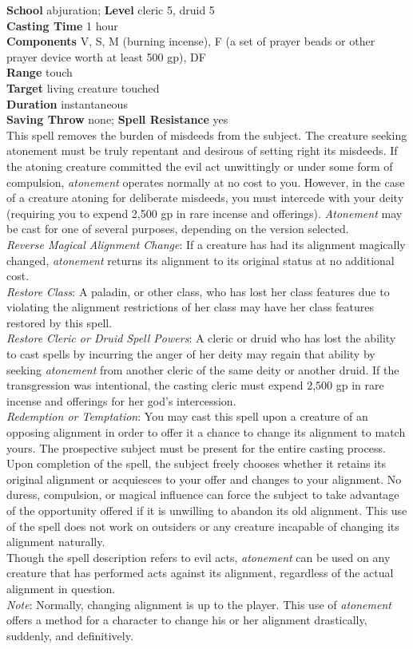 \textbf{School} abjuration; \textbf{Level} cleric 5, druid 5\\
\textbf{Casting Time} 1 hour\\
\textbf{Components} V, S, M (burning incense), F (a set of prayer beads or other prayer device worth at least 500 gp), DF\\
\textbf{Range} touch\\
\textbf{Target} living creature touched\\
\textbf{Duration} instantaneous\\
\textbf{Saving Throw} none; \textbf{Spell Resistance} yes\\
This spell removes the burden of misdeeds from the subject. The creature seeking atonement must be truly repentant and desirous of setting right its misdeeds. If the atoning creature committed the evil act unwittingly or under some form of compulsion, \textit{atonement }operates normally at no cost to you. However, in the case of a creature atoning for deliberate misdeeds, you must intercede with your deity (requiring you to expend 2,500 gp in rare incense and offerings). \textit{Atonement }may be cast for one of several purposes, depending on the version selected.\\
\textit{Reverse Magical Alignment Change}: If a creature has had its alignment magically changed, \textit{atonement }returns its alignment to its original status at no additional cost.\\
\textit{Restore Class}: A paladin, or other class, who has lost her class features due to violating the alignment restrictions of her class may have her class features restored by this spell. \\
\textit{Restore Cleric or Druid Spell Powers}: A cleric or druid who has lost the ability to cast spells by incurring the anger of her deity may regain that ability by seeking \textit{atonement }from another cleric of the same deity or another druid. If the transgression was intentional, the casting cleric must expend 2,500 gp in rare incense and offerings for her god's intercession.\\
\textit{Redemption or Temptation}: You may cast this spell upon a creature of an opposing alignment in order to offer it a chance to change its alignment to match yours. The prospective subject must be present for the entire casting process. Upon completion of the spell, the subject freely chooses whether it retains its original alignment or acquiesces to your offer and changes to your alignment. No duress, compulsion, or magical influence can force the subject to take advantage of the opportunity offered if it is unwilling to abandon its old alignment. This use of the spell does not work on outsiders or any creature incapable of changing its alignment naturally.\\
Though the spell description refers to evil acts, \textit{atonement }can be used on any creature that has performed acts against its alignment, regardless of the actual alignment in question.\\
\textit{Note}: Normally, changing alignment is up to the player. This use of \textit{atonement }offers a method for a character to change his or her alignment drastically, suddenly, and definitively.\\
